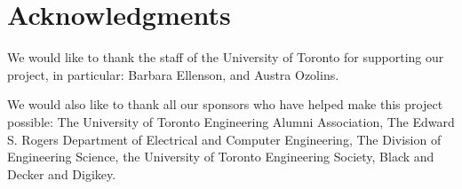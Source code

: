 
\section{Acknowledgments}
\label{ack}
\vspace{-.03in}

We would like to thank the staff of the University of Toronto for
supporting our project, in particular: Barbara Ellenson, and Austra Ozolins.

We would also like to thank all our sponsors who have helped make this
project possible: The University of Toronto Engineering Alumni
Association, The Edward S. Rogers Department of Electrical and
Computer Engineering, The Division of Engineering Science, the
University of Toronto Engineering Society, Black and Decker and Digikey.

